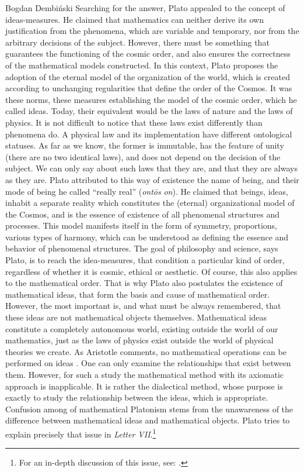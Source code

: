\begin{artengenv}{Bogdan Dembiński}
Searching for the answer, Plato appealed to the concept of ideas-measures. He claimed that mathematics can neither
derive its own justification from the phenomena, which are variable and temporary, nor from the arbitrary decisions of
the subject. However, there must be something that guarantees the functioning of the cosmic order, and also ensures the
correctness of the mathematical models constructed. In this context, Plato proposes the %
adoption of the eternal model of the organization of the world, which is created according to unchanging regularities
that define the order of the Cosmos. It was these norms, these measures establishing the model of the cosmic order,
which he called ideas. Today, their equivalent would be the laws of nature and the laws of physics. It is not difficult
to notice that these laws exist differently than phenomena do. A physical law and its implementation have different
ontological statuses. As far as we know, the former is immutable, has the feature of unity (there are no two identical
laws), and does not depend on the decision of the subject. We can only say about such laws that they are, and that they
are always as they are. Plato attributed to this way of existence the name of being, and their mode of being he called
``really real'' (\textit{ont\=os}\textbf{\textit{ }}\textit{on}). He claimed that beings, ideas, inhabit a separate
reality which constitutes the (eternal) organizational model of the Cosmos, and is the essence of existence of all
phenomenal structures and processes. This model manifests itself in the form of symmetry, proportions, various types of
harmony, which can be understood as defining the essence and behavior of phenomenal structures. The goal of philosophy
and science, says Plato, is to reach the idea-measures, that condition a particular kind of order, regardless of
whether it is cosmic, ethical or aesthetic. Of course, this also applies to the mathematical order. That is why Plato
also postulates the existence of mathematical ideas, that form the basis and cause of mathematical order. However, the
most important is, and what must be always remembered, that these ideas are not mathematical objects themselves.
Mathematical ideas constitute a completely autonomous world, existing outside the world of our mathematics, just as the
laws of physics exist outside the world of physical theories we create. As Aristotle comments, no mathematical
operations can be performed on ideas
\parencite[Metaphysica, 1081a]{aristotle_aristotles_1924}.
One can only
examine the relationships that exist between them. However, for such a study the mathematical method with its axiomatic
approach is inapplicable. It is rather the dialectical method, whose purpose is exactly to study the relationship
between the ideas, which is appropriate. Confusion among of mathematical Platonism stems from the unawareness of the
difference between mathematical ideas and mathematical objects. Plato tries to explain precisely that issue in
\textit{Letter VII}.\footnote{For an in-depth discussion of this issue, see:
\parencite[pp.55–110]{dembinski_pozna_2003}.
}


\end{artengenv}
